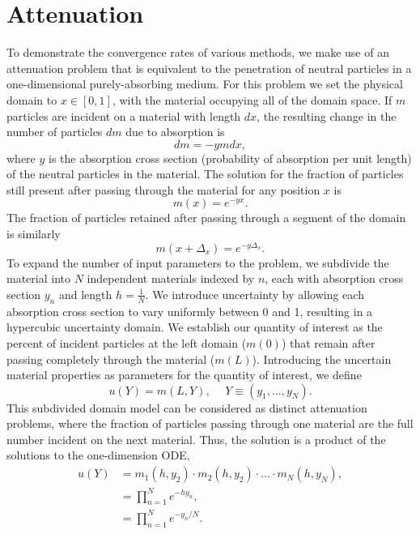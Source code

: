 \section{Attenuation}
To demonstrate the convergence rates of various methods, we make use of an attenuation problem that
is equivalent to the penetration of neutral particles in a one-dimensional purely-absorbing medium.  For this
problem we set the physical domain to $x\in[0,1]$, with the material occupying all of the domain space.  If $m$
particles are incident on a material with length $dx$, the resulting change in the number of particles $dm$
due to absorption is
\begin{equation}
  dm = -y m dx,
\end{equation}
where $y$ is the absorption cross section (probability of absorption per unit length) of the neutral particles
in the material.  The solution for the fraction of particles still present after passing through the material
for any position $x$ is
\begin{equation}
  m(x) = e^{-yx}.
\end{equation}
The fraction of particles retained after passing through a segment of the domain is similarly
\begin{equation}
  m(x+\Delta_x) = e^{-y\Delta_x}.
\end{equation}
To expand the number of input parameters to the problem, we subdivide the material into $N$ independent
materials indexed by $n$, each with absorption cross section $y_n$ and length $h=\frac{1}{N}$.  We introduce uncertainty
by allowing each absorption cross section to vary uniformly between 0 and 1, resulting in a hypercubic
uncertainty domain.  We establish our quantity of interest as the percent of incident particles at the left
domain ($m(0)$) that remain after passing completely through the material ($m(L)$).  Introducing the
uncertain material properties as parameters for the quantity of interest, we define
\begin{equation}
  u(Y) = m(L,Y),\hspace{15pt}Y\equiv(y_1,\ldots,y_N).
\end{equation}
This subdivided domain model can be considered as distinct attenuation problems, where the fraction of
particles passing through one material are the full number incident on the next material.  Thus, the solution
is a product of the solutions to the one-dimension ODE,
\begin{align}
  u(Y) &= m_1(h,y_2)\cdot m_2(h,y_2)\cdot\ldots\cdot m_N(h,y_N),\\
    &= \prod_{n=1}^N e^{-h y_n},\\
    &= \prod_{n=1}^N e^{-y_n/N}.
\end{align}

